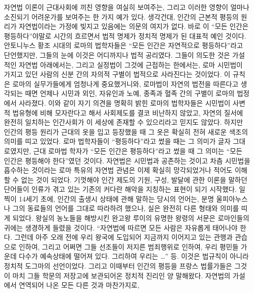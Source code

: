 자연법 이론이
근대사회에 끼친 영향을 여실히 보여주는,
그리고 이러한 영향이 얼마나 소진되기 어려운가를 보여주는
한 가지 예가 있다.
생각건대,
인간의 근본적 평등의 원리가
자연법이라는 가정에
빚지고 있음에는 의문의 여지가 없다.
바로 이 ``모든 인간은 평등하다''야말로
시간의 흐르면서 법적 명제가 정치적 명제가 된
대표적 예인 것이다.
안토니누스 황조 시대의 로마의 법학자들은
``모든 인간은 자연적으로 평등하다''라고 단언했지만,
그들의 눈에 이것은 어디까지나 법적 공리였다.
그들이 의도한 것은
가설적인 자연법 아래에서는, 그리고 실정법이 그것에 근접하는 한에서는,
로마 시민법이 가지고 있던 사람의 신분 간의 자의적 구별이
법적으로 사라진다는 것이었다.
이 규칙은 로마의 실무가들에게 엄청나게 중요했거니와,
로마법이 자연의 법전을 따른다고 생각되는 때면 언제나
시민과 외인, 자유인과 노예,
종족과 혈족 간의 구별이
로마의 법정에서 사라졌다.
이와 같이 자기 의견을 명확히 밝힌 로마의 법학자들은
시민법이 사변적 법유형에 비해 모자란다고 해서 사회제도를
결코 비난하지 않았고, 자연의 질서에 완전히 일치하는
인간사회가 이 세상에 존재할 수 있으리라고 믿지도 않았다.
하지만 인간의 평등 원리가 근대의 옷을 입고 등장했을 때
그 옷은 확실히 전혀 새로운 색조의 의미를 띠고 있었다.
로마 법학자들이 ``평등하다''라고 썼을 때는
그 의미가 글자 그대로였지만,
근대 로마법 학자가 ``모든 인간은 평등하다''라고 썼을 때
그 의미는 ``모든 인간은 평등해야 한다''였던 것이다.
자연법은 시민법과 공존하는 것이고 차츰 시민법을 흡수하는 것이라는
로마 특유의 자연법 관념은 이제 확실히 망각되었거나
적어도 이해할 수 없는 것이 되었다.
기껏해야 인간 제도의 기원, 구성, 발달에 관한 이론을 말하던 단어들이
인류가 겪고 있는 기존의 커다란 해악을 지칭하는 표현이 되기 시작했다.
일찍이 14세기 초에, 인간의 출생시 상태에 관해 말하는 당시의 언어는,
분명 울피아누스나 그의 동료들의 언어를 그대로 따라하려 했으나,
실은 완전히 다른 형태와 의미를 띠게 되었다.
왕실의 농노들을 해방시킨
완고왕 루이의 유명한 왕령의 서문은
로마인들의 귀에는 생경하게 들렸을 것이다.
``자연법에 따르면 모든 사람은 자유롭게
태어나야 한다.
그런데 아주 오래 전에 우리 왕국에 도입되어
지금까지 이어지고 있는 관행과 관습으로 인하여,
그리고 어쩌면 그들 선조들이 저지른 범죄행위로 인하여,
우리 평민들 가운데 다수가 예속상태에 떨어져 있다. 그리하여 우리는 \ldots'' 등.
이것은 법규칙이 아니라 정치적 도그마의 선언이었다.
그리고 이때부터 인간의 평등을 프랑스 법률가들은
그것이 마치 그들 학문의 저장고에 보관되어온 정치적 진리인 양 말해왔다.
자연법의 가설에서 연역되어 나온 모든 다른 것과 마찬가지로,
